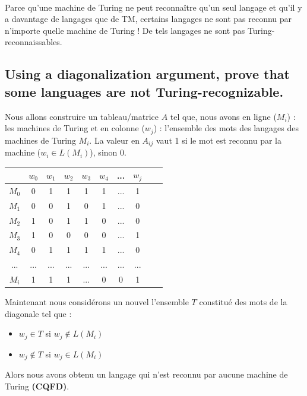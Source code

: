 \paragraph{}
Parce qu'une machine de Turing ne peut reconnaître qu'un seul langage et qu'il y a davantage de langages que de TM, certains langages ne sont pas reconnu par n'importe quelle machine de Turing ! De tels langages ne sont pas Turing-reconnaissables.

\subsection{ Using a diagonalization argument, prove that some languages are not Turing-recognizable. }
Nous allons construire un tableau/matrice $A$ tel que, nous avons en ligne ($M_i$) : les machines de Turing et en colonne ($w_j$) : l'ensemble des mots des langages des machines de Turing $M_i$. La valeur en $A_{ij}$ vaut 1 si le mot est reconnu par la machine ($w_i \in L(M_i)$), sinon 0.
\begin{center}
\begin{tabular}{| c | c | c | c | c | c | c | c | c | c |}
	\hline
          & $w_0$ & $w_1$ & $w_2$ & $w_3$ & $w_4$ & ... & $w_j$ \\
    \hline
    $M_0$ & 0     & 1     & 1     & 1     & 1     & ... & 1     \\
    \hline
    $M_1$ & 0     & 0     & 1     & 0     & 1     & ... & 0     \\
    \hline
    $M_2$ & 1     & 0     & 1     & 1     & 0     & ... & 0     \\
    \hline
    $M_3$ & 1	  & 0     & 0     & 0     & 0     & ... & 1     \\
    \hline
    $M_4$ & 0     & 1     & 1     & 1     & 1     & ... & 0     \\
    \hline
    $...$ & ...   & ...   & ...   & ...   & ...   & ... & ...   \\
    \hline
    $M_i$ & 1     & 1     & 1     & ...   & 0     & 0   & 1     \\
\end{tabular}
\end{center}

Maintenant nous considérons un nouvel l'ensemble $T$ constitué des mots de la diagonale tel que :
\begin{itemize}
\item $w_j \in T$ si $w_j \not\in L(M_i)$ 
\item $w_j \not\in T$ si $w_j \in L(M_i)$ 
\end{itemize}
Alors nous avons obtenu un langage qui n'est reconnu par aucune machine de Turing \textbf{(CQFD)}.

